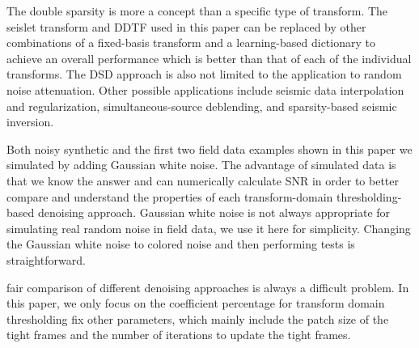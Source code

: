The double sparsity is more a concept than a specific type of transform. The seislet transform and DDTF used in this paper can be
replaced by other combinations of a fixed-basis transform and a learning-based dictionary to achieve an overall performance which is better than that of each of the
individual transforms. The DSD approach is also not limited to the application to random noise attenuation. Other possible applications include seismic data
interpolation and regularization, simultaneous-source deblending, and sparsity-based seismic inversion.

Both  noisy synthetic  and the first two field data examples shown in this paper we simulated by adding Gaussian white noise. The advantage of  simulated data is that we know the  answer and can numerically calculate SNR in order to better compare and understand the properties of each transform-domain thresholding-based denoising approach.  Gaussian white noise is not always appropriate for simulating real random noise in field data, we use it here for simplicity. Changing the Gaussian white noise to colored noise and then performing  tests is straightforward. 

  fair comparison of different denoising approaches is always a difficult problem. In this paper, we only focus on the coefficient percentage for transform domain thresholding %
  fix other parameters, which mainly include the patch size of the tight frames and the number of iterations to update the tight frames.  %

